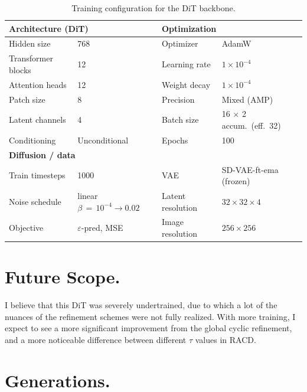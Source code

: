 \documentclass[10pt]{article}
\theoremstyle{plain}
\begin{document}
\begin{table}[H]
    \centering
    \caption{Training configuration for the DiT backbone.}
    \label{tab:trainconfig}
    \small
    \setlength{\tabcolsep}{6pt}
    \renewcommand{\arraystretch}{1.05}
    \begin{tabular}{ll@{\hskip 2em}ll}
        \toprule
        \multicolumn{2}{l}{\textbf{Architecture (DiT)}} & \multicolumn{2}{l}{\textbf{Optimization}} \\
        \midrule
        Hidden size      & 768            & Optimizer        & AdamW \\
        Transformer blocks & 12           & Learning rate    & $1\times10^{-4}$ \\
        Attention heads  & 12             & Weight decay     & $1\times10^{-4}$ \\
        Patch size       & 8              & Precision        & Mixed (AMP) \\
        Latent channels  & 4              & Batch size       & 16 $\times$ 2 accum.\ (eff.\ 32) \\
        Conditioning     & Unconditional  & Epochs           & 100 \\
        \midrule
        \multicolumn{2}{l}{\textbf{Diffusion / data}} & \multicolumn{2}{l}{} \\
        \midrule
        Train timesteps  & 1000           & VAE              & SD-VAE-ft-ema (frozen) \\
        Noise schedule   & linear $\beta\,{=}\,10^{-4}{\to}0.02$ & Latent resolution & $32\times32\times4$ \\
        Objective        & $\varepsilon$-pred, MSE & Image resolution & $256\times256$ \\
        \bottomrule
    \end{tabular}
\end{table}

\section{Future Scope.}

I believe that this DiT was severely undertrained, due to which a lot of the nuances of the refinement schemes were not fully realized. With more training, I expect to see a more significant improvement from the global cyclic refinement, and a more noticeable difference between different \(\tau\) values in RACD.

\newpage

\section{Generations.}
\end{document}
